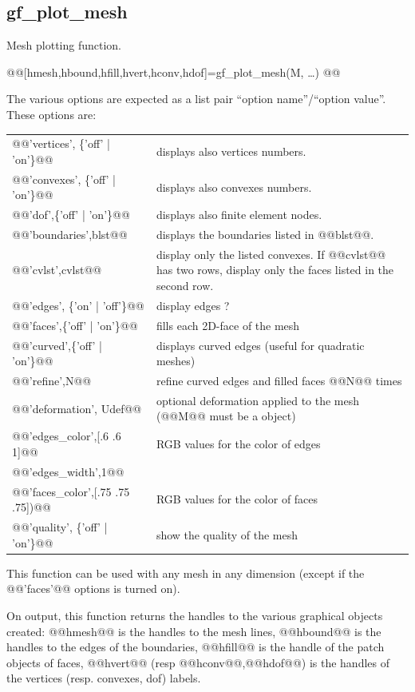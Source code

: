 \documentclass[11pt,a4paper]{article}
\newcommand{\hypertarget}[1]{\label{#1}}
\newcommand{\vartype}[1]{\xmlattributes*{a}{class="mltype"}{\link{#1}{typelist}}}
\newcommand{\vartype}[1]{\texttt{\textit{\hyperlink{typelist}{\textcolor{darkred}{#1}}}}}
\newcommand{\tmf}{\vartype{mesh\_fem}\xspace}
\begin{document}
\subsection{gf\_plot\_mesh}
\begin{purpose}
\hypertarget{gfplotmesh}
Mesh plotting function.
\end{purpose}
\begin{synopsis}
@@[hmesh,hbound,hfill,hvert,hconv,hdof]=gf_plot_mesh(M, \ldots)
@@\end{synopsis}
\begin{cmddescription}
  The various options are expected as a list pair ``option name''/``option value''.
  These options are:
\begin{center}
\begin{tabular}{|lp{}|}
  \hline
  @@'vertices', \{'off' | 'on'\}@@ &    displays also vertices numbers. \\
  @@'convexes', \{'off' | 'on'\}@@ &    displays also convexes numbers. \\
    @@'dof',\{'off' | 'on'\}@@ &         displays also finite element nodes.\\
    @@'boundaries',blst@@   &         displays the boundaries listed in @@blst@@.\\
    @@'cvlst',cvlst@@       &         display only the listed convexes. If
    @@cvlst@@ has two rows, display only the faces listed in the second row.\\
    @@'edges', \{'on' | 'off'\}@@ &     display edges ?\\
    @@'faces',\{'off' | 'on'\}@@  &         fills each 2D-face of the mesh\\
    @@'curved',\{'off' | 'on'\}@@  &        displays curved edges (useful for quadratic meshes)\\
    @@'refine',N@@              &     refine curved edges and filled faces @@N@@ times  \\
    @@'deformation', Udef@@       &   optional deformation applied to the mesh (@@M@@ must be a \tmf object)\\
    @@'edges_color',[.6 .6 1]@@  &     RGB values for the color of edges\\
    @@'edges_width',1@@         &     \\
    @@'faces_color',[.75 .75 .75])@@ &RGB values for the color of faces\\
    @@'quality', \{'off' | 'on'\}@@ &    show the quality of the mesh\\
    \hline
  \end{tabular}
\end{center}
  This function can be used with any mesh in any dimension (except if the @@'faces'@@ options is turned on).
  
  On output, this function returns the handles to the various
  graphical objects created: @@hmesh@@ is the handles to the mesh
  lines, @@hbound@@ is the handles to the edges of the boundaries, @@hfill@@
  is the handle of the patch objects of faces, @@hvert@@ (resp
  @@hconv@@,@@hdof@@) is the handles of the vertices (resp. convexes,
  dof) labels.

\end{cmddescription}
\end{document}
